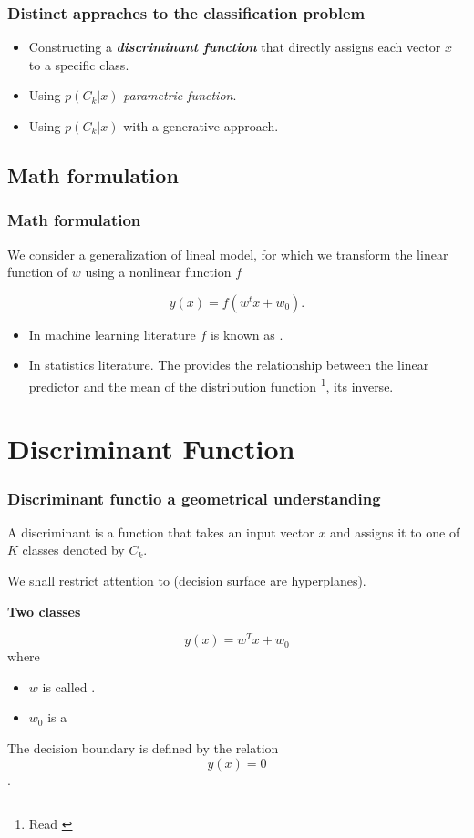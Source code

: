 \begin{frame}
    \frametitle{Distinct appraches to the classification problem}

    \begin{itemize}
        \item Constructing a \textbf{\textit{discriminant function}} that directly assigns each vector $x$ to a specific class. 
        \item Using $p(C_k | x)$ \textit{parametric function}.
        \item Using $p(C_k | x)$ with a generative approach. 
    \end{itemize}
\end{frame}

\subsection{Math formulation}
\begin{frame}
    \frametitle{Math formulation}
    We consider a generalization of lineal model, for which we 
    transform the linear function of $w$ using a nonlinear function $f$

    \begin{equation}
        y(x) = f( w^t x + w_0).
    \end{equation}

\begin{itemize}
        \item In machine learning literature $f$ is known as 
        .
        \item In statistics literature. The  provides the relationship between the linear predictor 
        and the mean of the distribution function \footnote{Read \cite{link_function}}, its inverse.
    \end{itemize}
\end{frame}

\section{ Discriminant Function}
\begin{frame}
    \frametitle{Discriminant functio a geometrical understanding}
    A discriminant is a function that takes an input vector $x$ and assigns it to one of $K$ classes denoted by $C_k$. 

    We shall restrict attention to  (decision surface are hyperplanes). 

    \textbf{Two classes }

    \begin{equation}
        y(x) = w^T x + w_0
    \end{equation}
    where 
    \begin{itemize}
        \item $w$ is called . 
        \item $w_0$ is a 
    \end{itemize}
The decision boundary is defined by the relation 
\begin{equation}
    y(x) = 0
\end{equation}.  
\end{frame}


